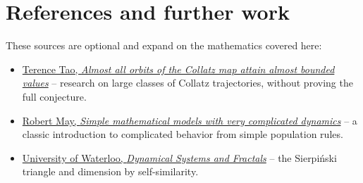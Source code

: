 \documentclass[11pt,letterpaper]{article}
\begin{document}
\section{References and further work}


These sources are optional and expand on the mathematics covered here:



\begin{itemize}
\item \href{https://arxiv.org/abs/1909.03562}{Terence Tao, \emph{Almost all orbits of the Collatz map attain almost bounded values}}  --  research on large classes of Collatz trajectories, without proving the full conjecture.

\item \href{https://doi.org/10.1038/261459a0}{Robert May, \emph{Simple mathematical models with very complicated dynamics}}  --  a classic introduction to complicated behavior from simple population rules.

\item \href{https://cemc.uwaterloo.ca/sites/default/files/documents/2024/Grade1112_20230308_DynamicalSystemsAndFractals2.html}{University of Waterloo, \emph{Dynamical Systems and Fractals}}  --  the Sierpiński triangle and dimension by self-similarity.


\end{itemize}



\clearpage
\end{document}
